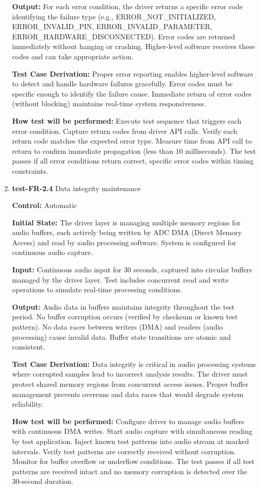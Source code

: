 \documentclass[12pt, titlepage]{article}
\begin{document}
\begin{enumerate}
\textbf{Output:}
For each error condition, the driver returns a specific error code identifying 
the failure type (e.g., ERROR\_NOT\_INITIALIZED, ERROR\_INVALID\_PIN, 
ERROR\_INVALID\_PARAMETER, ERROR\_HARDWARE\_DISCONNECTED). Error codes are 
returned immediately without hanging or crashing. Higher-level software receives 
these codes and can take appropriate action.

\textbf{Test Case Derivation:} 
Proper error reporting enables higher-level software to detect and handle 
hardware failures gracefully. Error codes must be specific enough to identify 
the failure cause. Immediate return of error codes (without blocking) maintains 
real-time system responsiveness.
					
\textbf{How test will be performed:}
Execute test sequence that triggers each error condition. Capture return codes 
from driver API calls. Verify each return code matches the expected error type. 
Measure time from API call to return to confirm immediate propagation (less than 
10 milliseconds). The test passes if all error conditions return correct, specific 
error codes within timing constraints.

\item{\textbf{test-FR-2.4} Data integrity maintenance\\}

\textbf{Control:} Automatic
					
\textbf{Initial State:} 
The driver layer is managing multiple memory regions for audio buffers, each 
actively being written by ADC DMA (Direct Memory Access) and read by audio 
processing software. System is configured for continuous audio capture.
					
\textbf{Input:}
Continuous audio input for 30 seconds, captured into circular buffers managed 
by the driver layer. Test includes concurrent read and write operations to 
simulate real-time processing conditions.
					
\textbf{Output:}
Audio data in buffers maintains integrity throughout the test period. No buffer 
corruption occurs (verified by checksum or known test pattern). No data races 
between writers (DMA) and readers (audio processing) cause invalid data. Buffer 
state transitions are atomic and consistent.

\textbf{Test Case Derivation:} 
Data integrity is critical in audio processing systems where corrupted samples 
lead to incorrect analysis results. The driver must protect shared memory regions 
from concurrent access issues. Proper buffer management prevents overruns and 
data races that would degrade system reliability.
					
\textbf{How test will be performed:}
Configure driver to manage audio buffers with continuous DMA writes. Start audio 
capture with simultaneous reading by test application. Inject known test patterns 
into audio stream at marked intervals. Verify test patterns are correctly received 
without corruption. Monitor for buffer overflow or underflow conditions. The test 
passes if all test patterns are received intact and no memory corruption is detected 
over the 30-second duration.

\end{enumerate}
\end{document}
